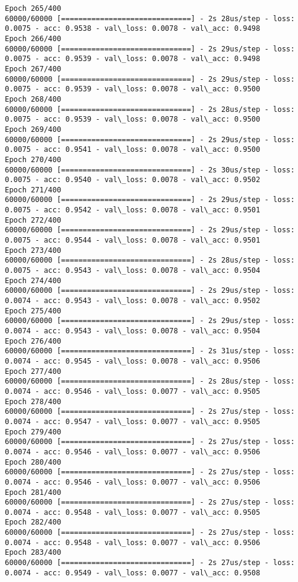 \documentclass[11pt]{article}
\begin{document}
\begin{Verbatim}[commandchars=\\\{\}]
Epoch 265/400
60000/60000 [==============================] - 2s 28us/step - loss: 0.0075 - acc: 0.9538 - val\_loss: 0.0078 - val\_acc: 0.9498
Epoch 266/400
60000/60000 [==============================] - 2s 29us/step - loss: 0.0075 - acc: 0.9539 - val\_loss: 0.0078 - val\_acc: 0.9498
Epoch 267/400
60000/60000 [==============================] - 2s 29us/step - loss: 0.0075 - acc: 0.9539 - val\_loss: 0.0078 - val\_acc: 0.9500
Epoch 268/400
60000/60000 [==============================] - 2s 28us/step - loss: 0.0075 - acc: 0.9539 - val\_loss: 0.0078 - val\_acc: 0.9500
Epoch 269/400
60000/60000 [==============================] - 2s 29us/step - loss: 0.0075 - acc: 0.9541 - val\_loss: 0.0078 - val\_acc: 0.9500
Epoch 270/400
60000/60000 [==============================] - 2s 30us/step - loss: 0.0075 - acc: 0.9540 - val\_loss: 0.0078 - val\_acc: 0.9502
Epoch 271/400
60000/60000 [==============================] - 2s 29us/step - loss: 0.0075 - acc: 0.9542 - val\_loss: 0.0078 - val\_acc: 0.9501
Epoch 272/400
60000/60000 [==============================] - 2s 29us/step - loss: 0.0075 - acc: 0.9544 - val\_loss: 0.0078 - val\_acc: 0.9501
Epoch 273/400
60000/60000 [==============================] - 2s 28us/step - loss: 0.0075 - acc: 0.9543 - val\_loss: 0.0078 - val\_acc: 0.9504
Epoch 274/400
60000/60000 [==============================] - 2s 29us/step - loss: 0.0074 - acc: 0.9543 - val\_loss: 0.0078 - val\_acc: 0.9502
Epoch 275/400
60000/60000 [==============================] - 2s 29us/step - loss: 0.0074 - acc: 0.9543 - val\_loss: 0.0078 - val\_acc: 0.9504
Epoch 276/400
60000/60000 [==============================] - 2s 31us/step - loss: 0.0074 - acc: 0.9545 - val\_loss: 0.0078 - val\_acc: 0.9506
Epoch 277/400
60000/60000 [==============================] - 2s 28us/step - loss: 0.0074 - acc: 0.9546 - val\_loss: 0.0077 - val\_acc: 0.9505
Epoch 278/400
60000/60000 [==============================] - 2s 27us/step - loss: 0.0074 - acc: 0.9547 - val\_loss: 0.0077 - val\_acc: 0.9505
Epoch 279/400
60000/60000 [==============================] - 2s 27us/step - loss: 0.0074 - acc: 0.9546 - val\_loss: 0.0077 - val\_acc: 0.9506
Epoch 280/400
60000/60000 [==============================] - 2s 27us/step - loss: 0.0074 - acc: 0.9546 - val\_loss: 0.0077 - val\_acc: 0.9506
Epoch 281/400
60000/60000 [==============================] - 2s 27us/step - loss: 0.0074 - acc: 0.9548 - val\_loss: 0.0077 - val\_acc: 0.9505
Epoch 282/400
60000/60000 [==============================] - 2s 27us/step - loss: 0.0074 - acc: 0.9548 - val\_loss: 0.0077 - val\_acc: 0.9506
Epoch 283/400
60000/60000 [==============================] - 2s 27us/step - loss: 0.0074 - acc: 0.9549 - val\_loss: 0.0077 - val\_acc: 0.9508

\end{Verbatim}
\end{document}
